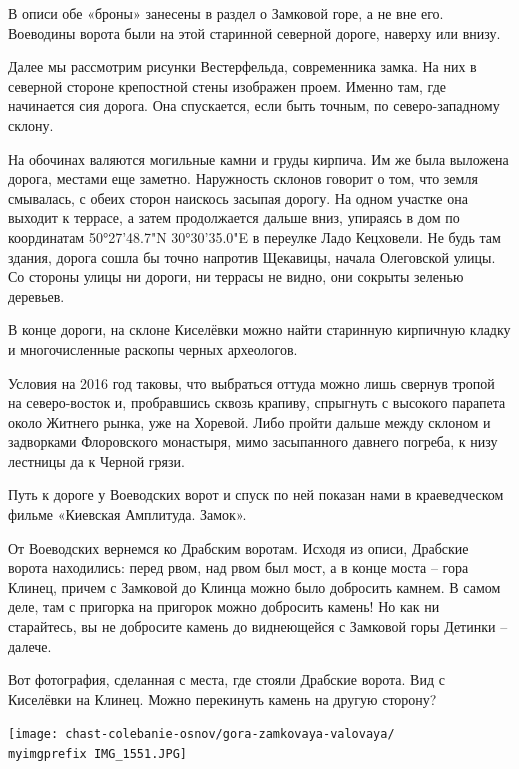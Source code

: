В описи обе «броны» занесены в раздел о Замковой горе, а не вне его. Воеводины ворота были на этой старинной северной дороге, наверху или внизу.

Далее мы рассмотрим рисунки Вестерфельда, современника замка. На них в северной стороне крепостной стены изображен проем. Именно там, где начинается сия дорога. Она спускается, если быть точным, по северо-западному склону.

На обочинах валяются могильные камни и груды кирпича. Им же была выложена дорога, местами еще заметно. Наружность склонов говорит о том, что земля смывалась, с обеих сторон наискось засыпая дорогу. На одном участке она выходит к террасе, а затем продолжается дальше вниз, упираясь в дом по координатам 50°27'48.7"N 30°30'35.0"E в переулке Ладо Кецховели. Не будь там здания, дорога сошла бы точно напротив Щекавицы, начала Олеговской улицы. Со стороны улицы ни дороги, ни террасы не видно, они сокрыты зеленью деревьев.

В конце дороги, на склоне Киселёвки можно найти старинную кирпичную кладку и многочисленные раскопы черных археологов. 

Условия на 2016 год таковы, что выбраться оттуда можно лишь свернув тропой на северо-восток и, пробравшись сквозь крапиву, спрыгнуть с высокого парапета около Житнего рынка, уже на Хоревой. Либо пройти дальше между склоном и задворками Флоровского монастыря, мимо засыпанного давнего погреба, к низу лестницы да к Черной грязи.

Путь к дороге у Воеводских ворот и спуск по ней показан нами в краеведческом фильме «Киевская Амплитуда. Замок».


От Воеводских вернемся ко Драбским воротам. Исходя из описи, Драбские ворота находились: перед рвом, над рвом был мост, а в конце моста – гора Клинец, причем с Замковой до Клинца можно было добросить камнем. В самом деле, там с пригорка на пригорок можно добросить камень! Но как ни старайтесь, вы не добросите камень до виднеющейся с Замковой горы Детинки – далече.

Вот фотография, сделанная с места, где стояли Драбские ворота. Вид с Киселёвки на Клинец. Можно перекинуть камень на другую сторону?

\begin{center}
\texttt{[image: chast-colebanie-osnov/gora-zamkovaya-valovaya/\\myimgprefix IMG\_1551.JPG]}
\end{center}

